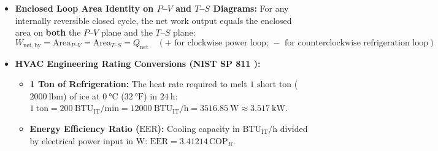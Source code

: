 \begin{formulacard}
\begin{itemize}
  \item \textbf{Enclosed Loop Area Identity on $P$--$V$ and $T$--$S$ Diagrams:} For any internally reversible closed cycle, the net work output equals the enclosed area on \textbf{both} the $P$--$V$ plane and the $T$--$S$ plane:
  \begin{equation}\label{eq:09:loop-area}
    \boxed{W_{\mathrm{net,by}} = \mathrm{Area}_{P\text{--}V} = \mathrm{Area}_{T\text{--}S} = Q_{\mathrm{net}}} \quad (+\text{ for clockwise power loop; } -\text{ for counterclockwise refrigeration loop})
  \end{equation}
  \item \textbf{HVAC Engineering Rating Conversions (NIST SP 811 ):}
  \begin{itemize}
    \item \textbf{1 Ton of Refrigeration:} The heat rate required to melt $1\text{ short ton}$ ($\SI{2000}{\text{lbm}}$) of ice at $\SI{0}{\celsius}$ ($\SI{32}{\degree\text{F}}$) in $\SI{24}{\hour}$: $\boxed{\SI{1}{\text{ton}} = \SI{200}{\text{BTU}_{\mathrm{IT}}\per\minute} = \SI{12000}{\text{BTU}_{\mathrm{IT}}\per\hour} = \SI{3516.85}{\watt} \approx \SI{3.517}{\kilo\watt}}$.
    \item \textbf{Energy Efficiency Ratio ($\mathrm{EER}$):} Cooling capacity in $\si{\text{BTU}_{\mathrm{IT}}\per\hour}$ divided by electrical power input in $\si{\watt}$: $\boxed{\mathrm{EER} = 3.41214\,\mathrm{COP}_R}$.
  \end{itemize}
\end{itemize}
\end{formulacard}

